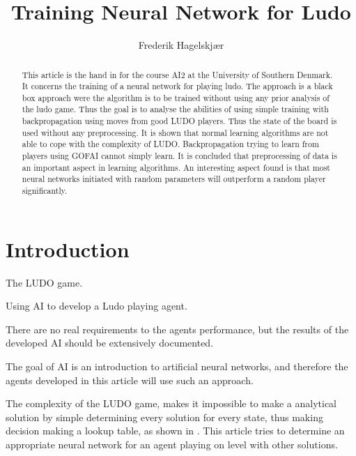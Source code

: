 \documentclass{llncs}
\begin{document}
\title{Training Neural Network for Ludo}
\author{Frederik Hagelskjær}
\maketitle

\begin{abstract}

This article is the hand in for the course AI2 at the University of Southern Denmark. It concerns the training of a neural network for playing ludo. The approach is a black box approach were the algorithm is to be trained without using any prior analysis of the ludo game. Thus the goal is to analyse the abilities of using simple training with backpropagation using moves from good LUDO players. Thus the state of the board is used without any preprocessing. It is shown that normal learning algorithms are not able to cope with the complexity of LUDO. Backpropagation trying to learn from players using GOFAI cannot simply learn. It is concluded that preprocessing of data is an important aspect in learning algorithms. An interesting aspect found is that most neural networks initiated with random parameters will outperform a random player significantly. 

\end{abstract}

\section*{Introduction} %

The LUDO game. 

Using AI to develop a Ludo playing agent. 

There are no real requirements to the agents performance, but the results of the developed AI should be extensively documented. 

The goal of AI is an introduction to artificial neural networks, and therefore the agents developed in this article will use such an approach.

The complexity of the LUDO game, makes it impossible to make a analytical solution by simple determining every solution for every state, thus making decision making a lookup table, as shown in \cite{6031999}. This article tries to determine an appropriate neural network for an agent playing on level with other solutions.
\end{document}

